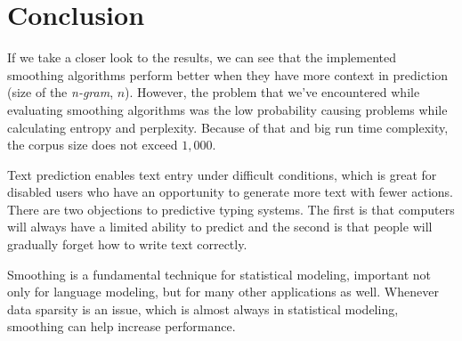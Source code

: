 \documentclass[10pt, a4paper]{article}
\begin{document}
\section{Conclusion}

If we take a closer look to the results, we can see that the implemented smoothing algorithms perform better when they have more context in prediction (size of the \textit{n-gram}, $n$). However, the problem that we\rq{}ve encountered while evaluating smoothing algorithms was the low probability causing problems while calculating entropy and perplexity. Because of that and big run time complexity, the corpus size does not exceed $1,000$.

Text prediction enables text entry under difficult conditions, which is great for disabled users who have an opportunity to generate more text with fewer actions. There are two objections to predictive typing systems. The first is that computers will always have a limited ability to predict and the second is that people will gradually forget how to write text correctly.

Smoothing is a fundamental technique for statistical modeling, important not only for language modeling, but for many other applications as well. Whenever data sparsity is an issue, which is almost always in statistical modeling, smoothing can help increase performance.


\nocite{*}
 
\end{document}
